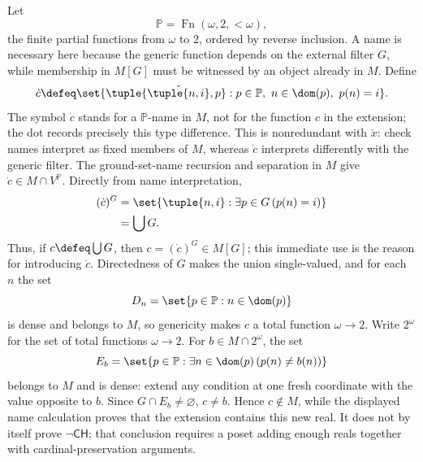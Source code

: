 \begin{example}
Let
\[
  \mathbb P=\operatorname{Fn}(\omega,2,{<}\omega),
\]
the finite partial functions from \(\omega\) to \(2\), ordered by reverse
inclusion.  A name is necessary here because the generic function depends on
the external filter \(G\), while membership in \(M[G]\) must be witnessed by
an object already in \(M\).  Define
\[
  \dot c\defeq
  \set{
    \tuple{\check{\tuple{n,i}},p}:
    p\in\mathbb P,\ n\in\dom(p),\ p(n)=i
  }.
\]
The symbol \(\dot c\) stands for a \(\mathbb P\)-name in \(M\), not for the
function \(c\) in the extension; the dot records precisely this type
difference.  This is nonredundant with \(\check x\): check names interpret as
fixed members of \(M\), whereas \(\dot c\) interprets differently with the generic
filter.  The ground-set-name recursion and separation in \(M\) give
\(\dot c\in M\cap V^{\mathbb P}\).  Directly from name interpretation,
\[
\begin{aligned}
  (\dot c)^G
    &=\set{\tuple{n,i}:\exists p\in G\,(p(n)=i)}\\
    &=\bigcup G.
\end{aligned}
\]
Thus, if \(c\defeq\bigcup G\), then \(c=(\dot c)^G\in M[G]\); this immediate
use is the reason for introducing \(\dot c\).  Directedness
of \(G\) makes the union single-valued, and for each \(n\) the set
\[
  D_n=\set{p\in\mathbb P:n\in\dom(p)}
\]
is dense and belongs to \(M\), so genericity makes \(c\) a total function
\(\omega\to2\).  Write \(2^\omega\) for the set of total functions
\(\omega\to2\).  For \(b\in M\cap2^\omega\), the set
\[
  E_b=\set{p\in\mathbb P:
            \exists n\in\dom(p)\,(p(n)\ne b(n))}
\]
belongs to \(M\) and is dense: extend any condition at one fresh coordinate
with the value opposite to \(b\).  Since \(G\cap E_b\ne\varnothing\),
\(c\ne b\).  Hence \(c\notin M\), while the displayed name calculation proves
that the extension contains this new real.  It does not by itself prove
\(\neg\mathsf{CH}\);
that conclusion requires a poset adding enough reals together with
cardinal-preservation arguments.
\end{example}

